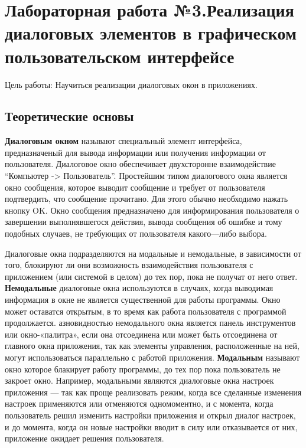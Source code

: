 \documentclass[a4paper]{article}
\begin{document}
\newpage
\section{Лабораторная работа №3.\newline Реализация диалоговых элементов в графическом пользовательском интерфейсе}

Цель работы: Научиться реализации диалоговых окон в приложениях.

\subsection{Теоретические основы}

\textbf{Диалоговым окном} называют специальный элемент интерфейса, предназначеный для вывода информации или получения информации от пользователя. Диалоговое окно обеспечивает двухсторонне взаимодействие ``Компьютер -> Пользователь''. Простейшим типом диалогового окна является окно сообщения, которое выводит сообщение и требует от пользователя подтвердить, что сообщение прочитано. Для этого обычно необходимо нажать кнопку OK. Окно сообщения предназначено для информирования пользователя о завершении выполнявшегося действия, вывода сообщения об ошибке и тому подобных случаев, не требующих от пользователя какого---либо выбора.

Диалоговые окна подразделяются на модальные и немодальные, в зависимости от того, блокируют ли они возможность взаимодействия пользователя с приложением (или системой в целом) до тех пор, пока не получат от него ответ. \textbf{Немодальные} диалоговые окна используются в случаях, когда выводимая информация в окне не является существенной для работы программы. Окно может оставатся открытым, в то время как работа пользователя с программой продолжается. азновидностью немодального окна является панель инструментов или окно-«палитра», если она отсоединена или может быть отсоединена от главного окна приложения, так как элементы управления, расположенные на ней, могут использоваться параллельно с работой приложения. \textbf{Модальным} называют окно которое блакирует работу программы, до тех пор пока пользователь не закроет окно. Например, модальными являются диалоговые окна настроек приложения — так как проще реализовать режим, когда все сделанные изменения настроек применяются или отменяются одномоментно, и с момента, когда пользователь решил изменить настройки приложения и открыл диалог настроек, и до момента, когда он новые настройки вводит в силу или отказывается от них, приложение ожидает решения пользователя.
\end{document}
